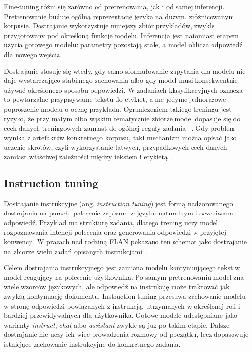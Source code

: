 Fine-tuning różni się zarówno od pretrenowania, jak i od samej inferencji.
Pretrenowanie buduje ogólną reprezentację języka na dużym, zróżnicowanym
korpusie. Dostrajanie wykorzystuje mniejszy zbiór przykładów, zwykle
przygotowany pod określoną funkcję modelu. Inferencja jest natomiast etapem
użycia gotowego modelu: parametry pozostają stałe, a model oblicza odpowiedź dla
nowego wejścia.

Dostrajanie stosuje się wtedy, gdy samo sformułowanie zapytania dla modelu nie daje
wystarczająco stabilnego zachowania albo gdy model musi konsekwentnie używać
określonego sposobu odpowiedzi. W zadaniach klasyfikacyjnych oznacza to
powtarzalne przypisywanie tekstu do etykiet, a nie jedynie jednorazowe
poproszenie modelu o ocenę przykładu. Ograniczeniem takiego treningu jest
ryzyko, że przy małym albo wąskim tematycznie zbiorze model dopasuje się
do cech danych treningowych zamiast do ogólnej reguły zadania
~\autocite[rozdz.~5.2]{goodfellow-deep-learning}. Gdy problem wynika z artefaktów
konkretnego korpusu, taki mechanizm można opisać jako uczenie skrótów, czyli
wykorzystanie łatwych, przypadkowych cech danych zamiast właściwej zależności
między tekstem i etykietą~\autocite{shortcut-learning}.

\subsection{Instruction tuning}

Dostrajanie instrukcyjne (ang. \emph{instruction tuning}) jest formą
nadzorowanego dostrajania na parach: polecenie zapisane w języku naturalnym i
oczekiwana odpowiedź. Przykład ma strukturę zadania, dlatego trening uczy model
rozpoznawania intencji polecenia oraz generowania odpowiedzi w przyjętej
konwencji. W pracach nad rodziną FLAN pokazano ten schemat jako dostrajanie na
zbiorze wielu zadań opisanych instrukcjami~\autocite{wei-finetuned-language-models}.

Celem dostrajania instrukcyjnego jest zamiana modelu kontynuującego tekst
w model reagujący na polecenie użytkownika. Po samym pretrenowaniu model zna 
wiele wzorców językowych, ale odpowiedź na instrukcję może traktować jak zwykłą kontynuację
dokumentu. Instruction tuning przesuwa zachowanie modelu w stronę odpowiedzi
powiązanych z instrukcją, utrzymanych w określonej roli i bardziej
przewidywalnych dla użytkownika. Gotowe modele udostępniane jako warianty
\emph{instruct}, \emph{chat} albo \emph{assistant} zwykle są już po takim
etapie. Dalsze dostrajanie nie uczy ich więc prowadzenia rozmowy od początku,
lecz dopasowuje istniejące zachowanie instrukcyjne do konkretnego zadania.

